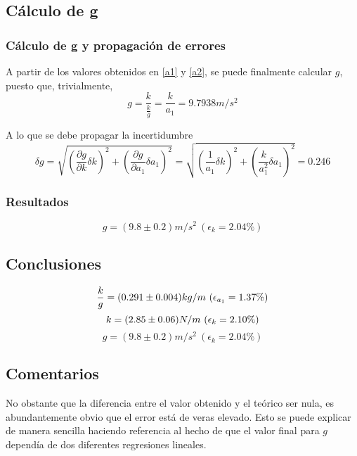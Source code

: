 \documentclass[a4paper,12pt]{article}
\begin{document}
\subsection{Cálculo de g}
\subsubsection{Cálculo de g y propagación de errores}
A partir de los valores obtenidos en \eqref{a1} y \eqref{a2}, se puede finalmente calcular $g$, 
puesto que, trivialmente, 
$$g = \frac{k}{\frac{k}{g}} = \frac{k}{a_1}= 9.7938 m/s^2$$

A lo que se debe propagar la incertidumbre
$$\delta g = \sqrt{\left(\frac{\partial g}{\partial k}\delta k \right)^2 +\left(\frac{\partial g}{\partial a_1}\delta a_1\right)^2} = \sqrt{\left(\frac{1}{a_1}\delta k\right)^2 + \left(\frac{k}{a_1^2}\delta a_1\right)^2} = 0.246$$

\subsubsection{Resultados}

\begin{tcolorbox}
    \begin{equation}
      g = (9.8 \pm 0.2) m/s^2 \ (\epsilon_k=2.04\%)
      \label{a3}
    \end{equation}
\end{tcolorbox}

\subsection{Conclusiones}

\begin{tcolorbox}
    \begin{equation*}
      \frac{k}{g} = (0.291 \pm 0.004) kg/m \ (\epsilon_{a_1}=1.37\%)\\
    \end{equation*}
    \begin{equation*}
      k = (2.85 \pm 0.06) N/m \ (\epsilon_k=2.10\%)\\
    \end{equation*}
    \begin{equation*}
      g = (9.8 \pm 0.2) m/s^2 \ (\epsilon_k=2.04\%)
    \end{equation*}
\end{tcolorbox}

\subsection{Comentarios}
No obstante que la diferencia entre el valor obtenido y el teórico
ser nula, es abundantemente obvio que el error está de veras elevado.
Esto se puede explicar de manera sencilla haciendo referencia
al hecho de que el valor final para $g$ dependía de dos diferentes
regresiones lineales.
\end{document}
